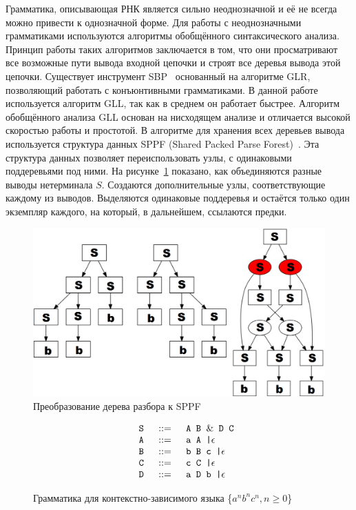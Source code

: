\documentclass[14pt]{matmex-diploma-custom}
\begin{document}
Грамматика, описывающая РНК является сильно неоднозначной и её не всегда можно привести к однозначной форме. Для работы с неоднозначными грамматиками используются алгоритмы обобщённого синтаксического анализа. Принцип работы таких алгоритмов заключается в том, что они просматривают все возможные пути вывода входной цепочки и строят все деревья вывода этой цепочки. Существует инструмент SBP~\cite{SBP} основанный на алгоритме GLR, позволяющий работать с конъюнтивными грамматиками. В данной работе используется алгоритм GLL, так как в среднем он работает быстрее. Алгоритм обобщённого анализа GLL основан на нисходящем анализе и отличается высокой скоростью работы и простотой. В алгоритме для хранения всех деревьев вывода используется структура данных SPPF (Shared Packed Parse Forest)~\cite{SPPF}. Эта структура данных позволяет переиспользовать узлы, с одинаковыми поддеревьями под ними. На рисунке~\ref{SPPF} показано, как объединяются разные выводы нетерминала $ S $. Создаются дополнительные узлы, соответствующие каждому из выводов. Выделяются одинаковые поддеревья и остаётся только один экземпляр каждого, на который, в дальнейшем, ссылаются предки.

\begin{figure}
\centering
\includegraphics[width=14cm]{courseworkpictures/SPPF.PNG}
\caption{Преобразование дерева разбора к SPPF}
\label{SPPF}
\end{figure}

\begin{figure}
$$
\begin{array}{crcl}
& \mbox{\texttt{ S }} &::=& \mbox{\texttt{ A B }} \& \mbox{\texttt{ D C}} \\
& \mbox{\texttt{ A }} & ::=& \mbox{\texttt{ a A |}}  \epsilon \\
& \mbox{\texttt{ B }} & ::=& \mbox{\texttt{ b B c |}}  \epsilon \\
& \mbox{\texttt{ C }} & ::=& \mbox{\texttt{ c C |}}  \epsilon \\
& \mbox{\texttt{ D }} & ::=& \mbox{\texttt{ a D b |}}\epsilon \\
\end{array}
$$
\caption{Грамматика для контекстно-зависимого языка \{$a^n b^n c^n, n \geq 0$\}}
\label{gabc}
\end{figure}
\end{document}
